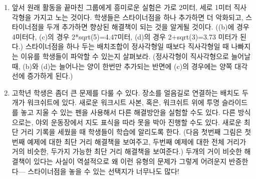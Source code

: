 \documentclass[]{article}
\begin{document}
\begin{enumerate}
\item
  앞서 원래 활동을 끝마친 그룹에게 흥미로운 실험은 가로 2미터, 세로
  1미터 직사각형을 가지고 노는 것이다. 학생들은 스타이너점을 하나
  추가하면 더 악화되고, 스타이너점을 두개 추가하면 향상된 해결책이 되는
  것을 알게될 것이다. ((b)에 경우 4미터다, (c)의 경우
  2*sqrt(5)=4.47미터, (d)의 경우 2+sqrt(3)=3.73 미터가 된다.)
  스타이너점을 하나 두는 배치조합이 정사각형일 때보다 직사각형일 때
  나빠지는 이유를 학생들이 파악할 수 있는지 살펴보라. (정사각형이
  직사각형으로 늘어날 때, (b)와 (d)는 늘어나는 양이 한번만 추가되는
  반면에 (c)의 경우에는 양쪽 대각선에 증가하게 된다.)
\item
  고학년 학생은 좀더 큰 문제를 다룰 수 있다. 장소를 얼음길로 연결하는
  배치도 두개가 워크쉬트에 있다. 새로운 워크시트 사본, 혹은, 워크쉬트
  위에 투명 슬라이드를 놓고 지울 수 있는 펜을 사용해서 다른 해결방안을
  실험할 수도 있다. 다른 방식으로는, 야외 운동장에서 지도 표식을 따라
  못을 박아 진행할 수도 있다. 새로운 최단 거리 기록을 세웠을 때 학생들이
  학습에 알리도록 한다. (다음 첫번째 그림은 첫번째 예제에 대한 최단 거리
  해결책을 보여주고, 두번째 예제에 대한 전체 거리가 거의 비슷한, 두가지
  가능한 최단 거리 해결책을 보여준다.) 두개의 거이 비슷한 해결책이
  있다는 사실이 역설적으로 왜 이런 유형의 문제가 그렇게 어려운지
  반증한다--- 스타이너점을 놓을 수 있는 선택지가 너무나도 많다!
\end{enumerate}
\end{document}
